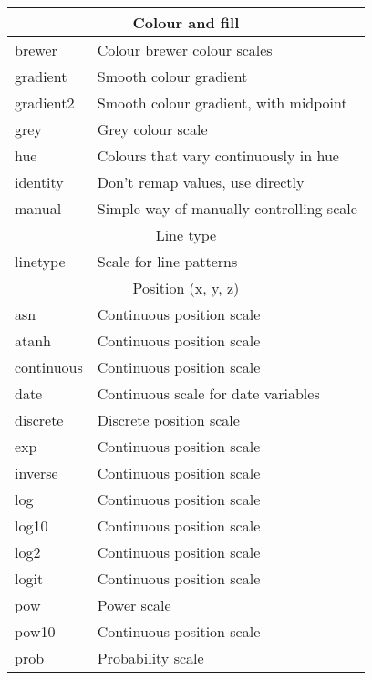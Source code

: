 \begin{table}
  \begin{center}
    \begin{tabular}{ll}
    \midrule
    \multicolumn{2}{c}{Colour and fill} \\
    \midrule
    brewer    & Colour brewer colour scales             \\
    gradient  & Smooth colour gradient                  \\
    gradient2 & Smooth colour gradient, with midpoint   \\
    grey      & Grey colour scale                       \\
    hue       & Colours that vary continuously in hue   \\
    identity  & Don't remap values, use directly        \\
    manual    & Simple way of manually controlling scale\\
     \midrule
    \multicolumn{2}{c}{Line type} \\
    \midrule
    linetype               &   Scale for line patterns\\
     \midrule
    \multicolumn{2}{c}{Position (x, y, z)} \\
    \midrule
    asn        & Continuous position scale          \\
    atanh      & Continuous position scale          \\
    continuous & Continuous position scale          \\
    date       & Continuous scale for date variables\\
    discrete   & Discrete position scale            \\
    exp        & Continuous position scale          \\
    inverse    & Continuous position scale          \\
    log        & Continuous position scale          \\
    log10      & Continuous position scale          \\
    log2       & Continuous position scale          \\
    logit      & Continuous position scale          \\
    pow        & Power scale                        \\
    pow10      & Continuous position scale          \\
    prob       & Probability scale                  \\

\end{tabular}
\end{center}
\end{table}
